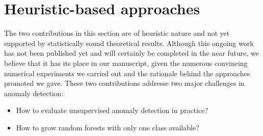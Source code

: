 



\section{Heuristic-based approaches}
\label{resume:sec:heuristic}

The two contributions in this section are of heuristic nature and not yet supported by statistically sound theoretical results. Although this ongoing work has not been published yet and will certainly be completed in the near future, we believe that it has its place in our manuscript, given the numerous convincing numerical experiments we carried out and the rationale behind the approaches promoted we gave.
%
These two contributions addresse two major challenges in anomaly detection:

\begin{itemize}
\item How to evaluate unsupervised anomaly detection in practice?
\item How to grow random forests with only one class available?
\end{itemize}


